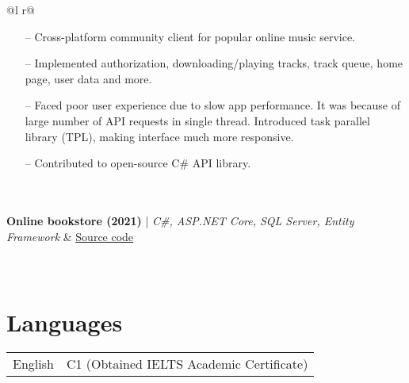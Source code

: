 \documentclass[a4paper,12pt]{article}
\begin{document}
\begin{tabularx}{\linewidth}{ @{}l r@{} }
{\begin{minipage}[t]{\linewidth}
\begin{itemize}[nosep,after=\strut, leftmargin=1em, itemsep=3pt]
        \item[--] Cross-platform community client for popular online music service.
        \item[--] Implemented authorization, downloading/playing tracks, track queue, home page, user data and more.
        \item [--] Faced poor user experience due to slow app performance. It was because of large number of API requests in single thread. Introduced task parallel library (TPL), making interface much more responsive.
        \item [--] Contributed to open-source C\# API library.
    \end{itemize}
    \end{minipage}
}  \\
\\
\textbf{Online bookstore (2021)} | \emph{C\#, ASP.NET Core, SQL Server, Entity Framework} & \hfill \href{https://github.com/andude10/The-Tome/}{Source code} \\[3.75pt]
  \\
\\
\end{tabularx}

\section{Languages}

\begin{tabularx}{\linewidth}{@{}l X@{}}
English  &  \normalsize{C1 (Obtained IELTS Academic Certificate)}\\
\end{tabularx}

\vfill
{}
\end{document}
